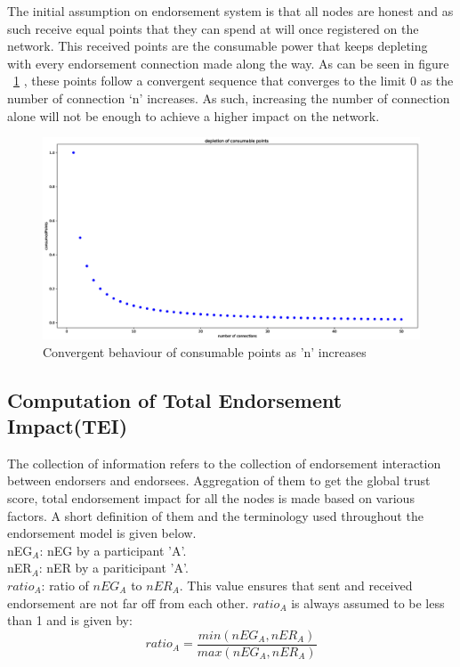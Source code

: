 The initial assumption on endorsement system is that all nodes are honest and
as such receive equal points that they can spend at will once registered on the
network. This received points are the consumable power that keeps depleting
with every endorsement connection made along the way. As can be seen in figure
~\ref{consumablePoint} , these points follow a convergent sequence that
converges to the limit 0 as the number of connection `n' increases. As such,
increasing the number of connection alone will not be enough to achieve a
higher impact on the network.
\begin{figure}
	\centering
	\includegraphics[width=1.0\textwidth]{Images/ConsumablePoints.eps}
	\caption{Convergent behaviour of consumable points as 'n' increases}
	\label{consumablePoint}
\end{figure}

\subsection{Computation of Total Endorsement Impact(TEI)} 
The collection of information refers to the collection of endorsement
interaction between endorsers and endorsees.  Aggregation of them to get the
global trust score, total endorsement impact for all the nodes is made based on
various factors. A short definition of them and the terminology used throughout
the endorsement model is given below. \\ 

\acrshort{nEG}$_A$: \ac{nEG} by a participant 'A'. \\

\acrshort{nER}$_A$: \ac{nER} by a pariticipant 'A'. \\
{$ratio_A$}: ratio of \textit{$nEG_A$} to \textit{$nER_A$}. This value
ensures that sent and received endorsement are not far off from  each other.
\textit{$ratio_A$} is always assumed to be less than 1 and is given by: 
\begin{equation}
	ratio_A = \frac{min(nEG_A,nER_A)}{max(nEG_A,nER_A)} 
\end{equation}

